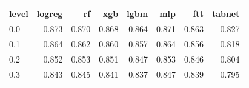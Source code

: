 \begin{tabular}{lrrrrrrr}
\toprule
level & logreg & rf & xgb & lgbm & mlp & ftt & tabnet \\
\midrule
0.0 & 0.873 & 0.870 & 0.868 & 0.864 & 0.871 & 0.863 & 0.827 \\
0.1 & 0.864 & 0.862 & 0.860 & 0.857 & 0.864 & 0.856 & 0.818 \\
0.2 & 0.852 & 0.853 & 0.851 & 0.847 & 0.853 & 0.846 & 0.804 \\
0.3 & 0.843 & 0.845 & 0.841 & 0.837 & 0.847 & 0.839 & 0.795 \\
\bottomrule
\end{tabular}
